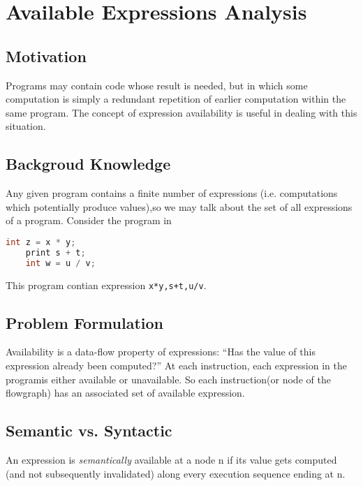 \newpage

\section{Available Expressions Analysis}

\subsection{Motivation}

Programs may contain code whose result is needed, but in which some computation is simply a redundant 
repetition of earlier computation within the same program. The concept of expression availability is useful in dealing with this situation.


\subsection{Backgroud Knowledge}

Any given program contains a finite number of expressions (i.e. computations which potentially 
produce values),so we may talk about the set of all expressions of a program. Consider the program in 




\begin{lstlisting}[language=C,frame=single, caption=An ,label = lst:expression1]
    int z = x * y; 
    print s + t; 
    int w = u / v;
\end{lstlisting}


This program contian expression \texttt{x*y,s+t,u/v}.



\subsection{Problem Formulation}


Availability is a data-flow property of expressions: “Has the value of this expression already been computed?”
At each instruction, each expression in the programis either available or unavailable. So each instruction(or node of the flowgraph) has 
an associated set of available expression. 



\subsection{Semantic vs. Syntactic}

An expression is \textit{semantically} available at a node n if its value gets computed 
(and not subsequently invalidated) along every execution sequence ending at n.

